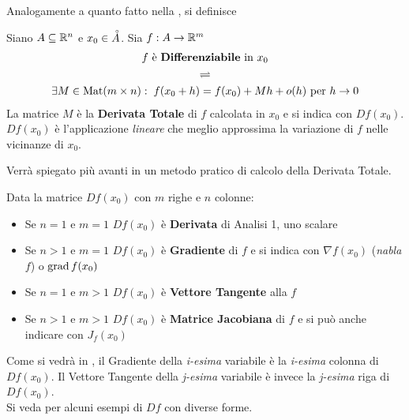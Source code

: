 \noindent Analogamente a quanto fatto nella , si definisce
\begin{definition}[Differenziale]
	\label{def:differenz}
	Siano $A \subseteq \mathbb{R}^n$ e $x_0 \in \accentset{\circ}{A}$. Sia $f: A \to \mathbb{R}^m$
	\begin{equation*}
		\begin{gathered}
			f \text{ è \textbf{Differenziabile} in } x_0\\
			\rightleftharpoons\\
			\exists M \in \operatorname{Mat} (m \times n):\; f(x_0 + h) = f(x_0) + Mh + o(h) \text{ per } h \to 0
		\end{gathered}
	\end{equation*}
	La matrice $M$ è la \textbf{Derivata Totale} di $f$ calcolata in $x_0$ e si indica con $Df(x_0)$. $Df(x_0)$ è l'applicazione \textit{lineare} che meglio approssima la variazione di $f$ nelle vicinanze di $x_0$.
	\begin{note}
		Verrà spiegato più avanti in  un metodo pratico di calcolo della Derivata Totale.
	\end{note}
\end{definition}
\begin{observation}
	\label{obs:matr_deriv_tot}
	Data la matrice $Df(x_0)$ con $m$ righe e $n$ colonne:
	\begin{itemize}
		\item Se $n = 1$ e $m = 1$ $Df(x_0)$ è \textbf{Derivata} di Analisi 1, uno scalare
		\item Se $n > 1$ e $m = 1$ $Df(x_0)$ è \textbf{Gradiente} di $f$ e si indica con $\nabla f(x_0)$ (\textit{nabla} $f$) o $\operatorname{grad} f(x_0)$
		\item Se $n = 1$ e $m > 1$ $Df(x_0)$ è \textbf{Vettore Tangente} alla $f$
		\item Se $n > 1$ e $m > 1$ $Df(x_0)$ è \textbf{Matrice Jacobiana} di $f$ e si può anche indicare con $J_f(x_0)$
	\end{itemize}
	Come si vedrà in , il Gradiente della \textit{i-esima} variabile è la \textit{i-esima} colonna di $Df(x_0)$. Il Vettore Tangente della \textit{j-esima} variabile è invece la \textit{j-esima} riga di $Df(x_0)$.\\
	Si veda  per alcuni esempi di $Df$ con diverse forme.
\end{observation}
